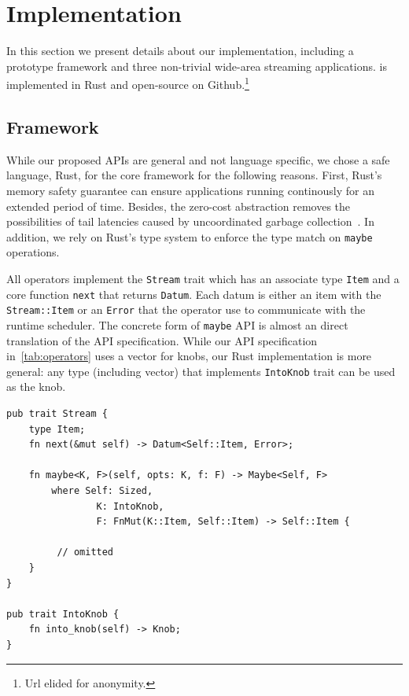 \chapter{Implementation}
\label{sec:implementation}

In this section we present details about our implementation, including a
prototype framework and three non-trivial wide-area streaming applications.
\sysname{} is implemented in Rust and open-source on Github.\footnote{Url elided
  for anonymity.}

\section{Framework}
\label{sec:framework}

While our proposed APIs are general and not language specific, we chose a safe
language, Rust, for the core framework for the following reasons. First, Rust's
memory safety guarantee can ensure applications running continously for an
extended period of time. Besides, the zero-cost abstraction removes the
possibilities of tail latencies caused by uncoordinated garbage
collection~\cite{maas2016taurus}. In addition, we rely on Rust's type system to
enforce the type match on \texttt{maybe} operations.

\begin{sloppypar}
All operators implement the \texttt{Stream} trait which has an associate type
\texttt{Item} and a core function \texttt{next} that returns
\texttt{Datum}. Each datum is either an item with the \texttt{Stream::Item} or
an \texttt{Error} that the operator use to communicate with the runtime
scheduler. The concrete form of \texttt{maybe} API is almost an direct
translation of the API specification. While our API specification
in~\autoref{tab:operators} uses a vector for knobs, our Rust implementation is
more general: any type (including vector) that implements \texttt{IntoKnob}
trait can be used as the knob.
\end{sloppypar}

\begin{lstlisting}
pub trait Stream {
    type Item;
    fn next(&mut self) -> Datum<Self::Item, Error>;

    fn maybe<K, F>(self, opts: K, f: F) -> Maybe<Self, F>
        where Self: Sized,
                K: IntoKnob,
                F: FnMut(K::Item, Self::Item) -> Self::Item {

         // omitted
    }
}

pub trait IntoKnob {
    fn into_knob(self) -> Knob;
}
\end{lstlisting}

